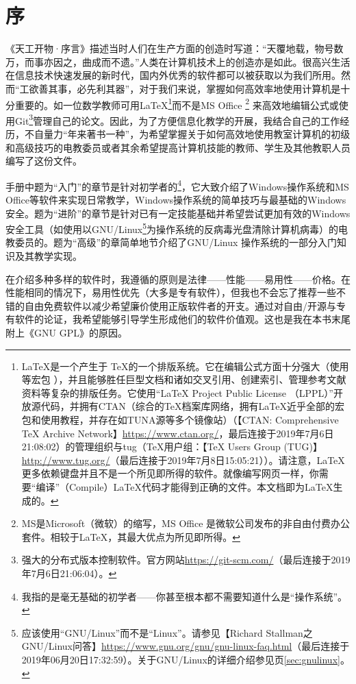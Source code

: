 \section{序}
《天工开物·序言》描述当时人们在生产方面的创造时写道：“天覆地载，物号数万，而事亦因之，曲成而不遗。”人类在计算机技术上的创造亦是如此。很高兴生活在信息技术快速发展的新时代，国内外优秀的软件都可以被获取以为我们所用。然而“工欲善其事，必先利其器”，对于我们来说，掌握如何高效率地使用计算机是十分重要的。如一位数学教师可用\LaTeX\footnote{\LaTeX 是一个产生于 \TeX 的一个排版系统。它在编辑公式方面十分强大（使用 \AmSTeX 等宏包 ），并且能够胜任巨型文档和诸如交叉引用、创建索引、管理参考文献资料等复杂的排版任务。它使用“LaTeX Project Public Li­cense （LPPL）”开放源代码，并拥有CTAN（综合的TeX档案库网络，拥有\LaTeX 近乎全部的宏包和使用教程，并存在如TUNA源等多个镜像站）（【CTAN: Comprehensive TeX Archive Network】\url{https://www.ctan.org/}，最后连接于2019年7月6日21:08:02）的管理组织与tug（\TeX 用户组：【TeX Users Group (TUG)】\url{http://www.tug.org/}（最后连接于2019年7月8日15:05:21））。请注意，\LaTeX 更多依赖键盘并且不是一个所见即所得的软件。就像编写网页一样，你需要“编译”（Compile）\LaTeX 代码才能得到正确的文件。本文档即为\LaTeX 生成的。}而不是MS Office \footnote{MS是Microsoft（微软）的缩写，MS Office 是微软公司发布的非自由付费办公套件。相较于\LaTeX ，其最大优点为所见即所得。} 来高效地编辑公式或使用Git\footnote{强大的分布式版本控制软件。官方网站\url{https://git-scm.com/}（最后连接于2019年7月6日21:06:04）。}管理自己的论文。因此，为了方便信息化教学的开展，我结合自己的工作经历，不自量力“年来著书一种”，为希望掌握关于如何高效地使用教室计算机的初级和高级技巧的电教委员或者其余希望提高计算机技能的教师、学生及其他教职人员编写了这份文件。\par
手册中题为“入门”的章节是针对初学者的\footnote{我指的是毫无基础的初学者——你甚至根本都不需要知道什么是“操作系统”。}，它大致介绍了Windows操作系统和MS Office等软件来实现日常教学，Windows操作系统的简单技巧与最基础的Windows安全。题为“进阶”的章节是针对已有一定技能基础并希望尝试更加有效的Windows安全工具（如使用以GNU/Linux\footnote{应该使用“GNU/Linux”而不是“Linux”。请参见【Richard Stallman之GNU/Linux问答】\url{https://www.gnu.org/gnu/gnu-linux-faq.html}（最后连接于2019年06月20日17:32:59）。关于GNU/Linux的详细介绍参见\pageref{sec:gnulinux}页\ref{sec:gnulinux}。}为操作系统的反病毒光盘清除计算机病毒）的电教委员的。题为“高级”的章简单地节介绍了GNU/Linux 操作系统的一部分入门知识及其教学实现。\par
在介绍多种多样的软件时，我遵循的原则是法律——性能——易用性——价格。在性能相同的情况下，易用性优先（大多是专有软件），但我也不会忘了推荐一些不错的自由免费软件以减少希望廉价使用正版软件者的开支。通过对自由/开源与专有软件的论证，我希望能够引导学生形成他们的软件价值观。这也是我在本书末尾附上《GNU GPL》的原因。\par
